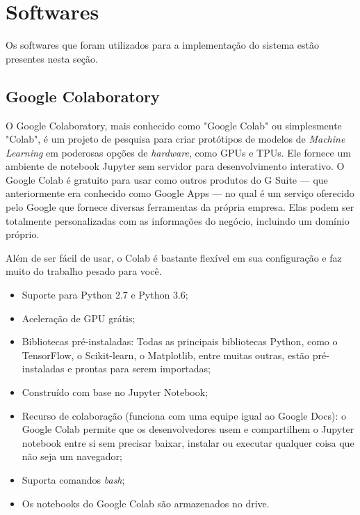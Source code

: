 \section{Softwares}
Os softwares que foram utilizados para a implementação do sistema estão presentes nesta seção.
\subsection{Google Colaboratory}
O Google Colaboratory, mais conhecido como "Google Colab" ou simplesmente "Colab", é um projeto de pesquisa para criar protótipos de modelos de \textit{Machine Learning} em poderosas opções de \textit{hardware}, como GPUs e TPUs. Ele fornece um ambiente de notebook Jupyter sem servidor para desenvolvimento interativo. O Google Colab é gratuito para usar como outros produtos do G Suite — que anteriormente era conhecido como Google Apps — no qual é um serviço oferecido pelo Google que fornece diversas ferramentas da própria empresa. Elas podem ser totalmente personalizadas com as informações do negócio, incluindo um domínio próprio.

Além de ser fácil de usar, o Colab é bastante flexível em sua configuração e faz muito do trabalho pesado para você. \cite{colabdetail}

\begin{itemize}
    \item Suporte para Python 2.7 e Python 3.6;
    \item Aceleração de GPU grátis;
    \item Bibliotecas pré-instaladas: Todas as principais bibliotecas Python, como o TensorFlow, o Scikit-learn, o Matplotlib, entre muitas outras, estão pré-instaladas e prontas para serem importadas;
    \item Construído com base no Jupyter Notebook;
    \item Recurso de colaboração (funciona com uma equipe igual ao Google Docs): o Google Colab permite que os desenvolvedores usem e compartilhem o Jupyter notebook entre si sem precisar baixar, instalar ou executar qualquer coisa que não seja um navegador;
    \item Suporta comandos \textit{bash};
    \item Os notebooks do Google Colab são armazenados no drive.
\end{itemize}

